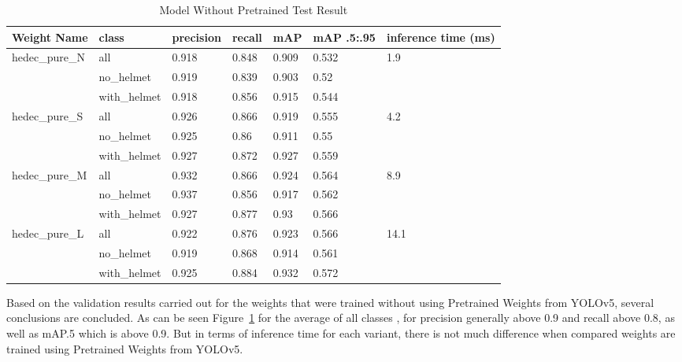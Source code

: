 \begin{table}
  \centering
  \caption{Model Without Pretrained Test Result}
  \label{tb:purebenchmarktest}
  \begin{tabular}{|l|l|l|l|l|l|l||} 
    \hline
    Weight Name                          & class        & precision & recall & mAP   & mAP .5:.95 & inference time (ms)    \\ 
    \hline
    \multirow{3}{*}{hedec\_pure\_N}     & all          & 0.918     & 0.848  & 0.909 & 0.532      & \multirow{3}{*}{1.9}   \\
                                        & no\_helmet   & 0.919     & 0.839  & 0.903 & 0.52       &                        \\
                                        & with\_helmet & 0.918     & 0.856  & 0.915 & 0.544      &                        \\ 
    \hline
    \multirow{3}{*}{hedec\_pure\_S}     & all          & 0.926     & 0.866  & 0.919 & 0.555      & \multirow{3}{*}{4.2}   \\
                                        & no\_helmet   & 0.925     & 0.86   & 0.911 & 0.55       &                        \\
                                        & with\_helmet & 0.927     & 0.872  & 0.927 & 0.559      &                        \\ 
    \hline
    \multirow{3}{*}{hedec\_pure\_M}     & all          & 0.932     & 0.866  & 0.924 & 0.564      & \multirow{3}{*}{8.9}   \\
                                        & no\_helmet   & 0.937     & 0.856  & 0.917 & 0.562      &                        \\
                                        & with\_helmet & 0.927     & 0.877  & 0.93  & 0.566      &                        \\ 
    \hline
    \multirow{3}{*}{hedec\_pure\_L}     & all          & 0.922     & 0.876  & 0.923 & 0.566      & \multirow{3}{*}{14.1}  \\
                                        & no\_helmet   & 0.919     & 0.868  & 0.914 & 0.561      &                        \\
                                        & with\_helmet & 0.925     & 0.884  & 0.932 & 0.572      &                        \\
    \hline
  \end{tabular}
\end{table}

\par Based on the validation results carried out for the weights that were trained without using Pretrained Weights from YOLOv5, several conclusions are concluded. As can be seen Figure~\ref{tb:purebenchmarktest} for the average of all classes , for precision generally above 0.9 and recall above 0.8, as well as mAP.5 which is above 0.9. But in terms of inference time for each variant, there is not much difference when compared weights are trained using Pretrained Weights from YOLOv5.

